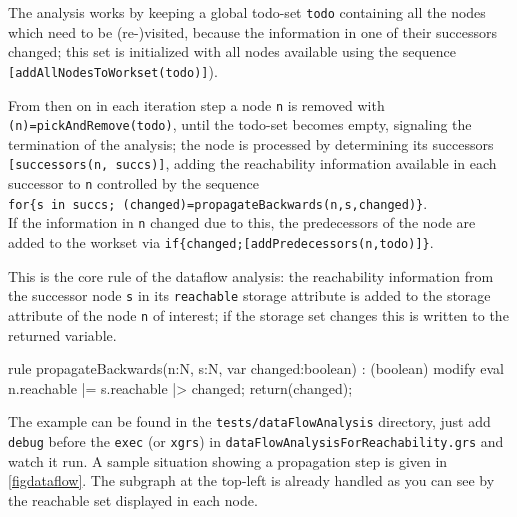 The analysis works by keeping a global todo-set \verb#todo# containing all the nodes which need to be (re-)visited,
because the information in one of their successors changed;
this set is initialized with all nodes available using the sequence \verb#[addAllNodesToWorkset(todo)]#).

From then on in each iteration step a node \verb#n# is removed with \verb#(n)=pickAndRemove(todo)#, until the todo-set becomes empty, signaling the termination of the analysis; the node is processed by determining its successors \verb#[successors(n, succs)]#, adding the reachability information available in each successor to \verb#n# controlled by the sequence\\
\verb#for{s in succs; (changed)=propagateBackwards(n,s,changed)}#.\\
If the information in \verb#n# changed due to this, the predecessors of the node are added to the workset via \verb#if{changed;[addPredecessors(n,todo)]}#.

  \begin{example}
This is the core rule of the dataflow analysis: the reachability information from the successor node \texttt{s} in its \texttt{reachable} storage attribute is added to the storage attribute of the node \texttt{n} of interest; if the storage set changes this is written to the returned variable.
    \begin{grgen}
rule propagateBackwards(n:N, s:N, var changed:boolean) : (boolean)
{
  modify {
    eval { n.reachable |= s.reachable |> changed; }
    return(changed);
  }
}
    \end{grgen}
  \end{example}

The example can be found in the \texttt{tests/dataFlowAnalysis} directory, just add \texttt{debug} before the \texttt{exec} (or \texttt{xgrs}) in \texttt{dataFlowAnalysisForReachability.grs} and watch it run.
A sample situation showing a propagation step is given in \ref{figdataflow}.
The subgraph at the top-left is already handled as you can see by the reachable set displayed in each node.

